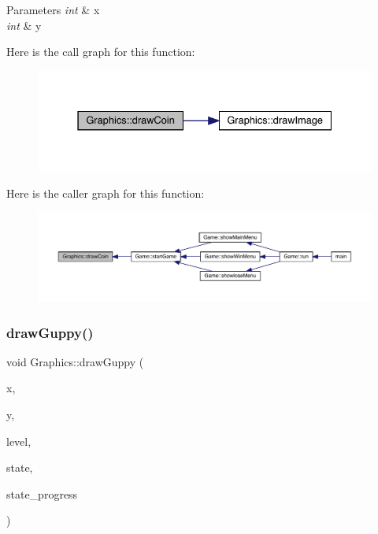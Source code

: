 \begin{DoxyParams}{Parameters}
{\em int} & x \\
\hline
{\em int} & y \\
\hline
\end{DoxyParams}
Here is the call graph for this function\+:\nopagebreak
\begin{figure}[H]
\begin{center}
\leavevmode
\includegraphics[width=331pt]{class_graphics_a62b98d9f52ad55e9bd8617130cfbf37b_cgraph}
\end{center}
\end{figure}
Here is the caller graph for this function\+:
\nopagebreak
\begin{figure}[H]
\begin{center}
\leavevmode
\includegraphics[width=350pt]{class_graphics_a62b98d9f52ad55e9bd8617130cfbf37b_icgraph}
\end{center}
\end{figure}
\mbox{\label{class_graphics_a35aa55c180a9f9be306b74906f710954}} 
\subsubsection{\texorpdfstring{draw\+Guppy()}{drawGuppy()}}
{\footnotesize\ttfamily void Graphics\+::draw\+Guppy (\begin{DoxyParamCaption}\item[{int}]{x,  }\item[{int}]{y,  }\item[{int}]{level,  }\item[{\mbox{\hyperlink{_constants_8hpp_a5d74787dedbc4e11c1ab15bf487e61f8}{State}}}]{state,  }\item[{int}]{state\+\_\+progress }\end{DoxyParamCaption})}




